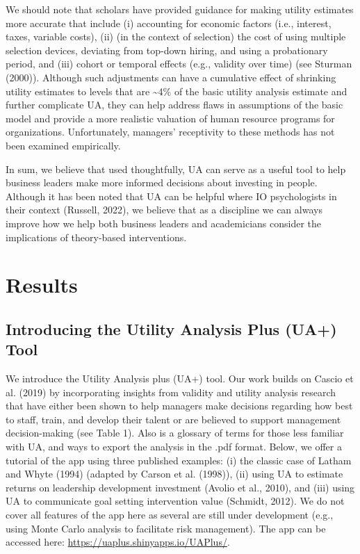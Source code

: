 \documentclass[
  english,
  man]{apa6}
\begin{document}
We should note that scholars have provided guidance for making utility estimates more accurate that include (i) accounting for economic factors (i.e., interest, taxes, variable costs), (ii) (in the context of selection) the cost of using multiple selection devices, deviating from top-down hiring, and using a probationary period, and (iii) cohort or temporal effects (e.g., validity over time) (see Sturman (2000)). Although such adjustments can have a cumulative effect of shrinking utility estimates to levels that are \textasciitilde4\% of the basic utility analysis estimate and further complicate UA, they can help address flaws in assumptions of the basic model and provide a more realistic valuation of human resource programs for organizations. Unfortunately, managers' receptivity to these methods has not been examined empirically.

In sum, we believe that used thoughtfully, UA can serve as a useful tool to help business leaders make more informed decisions about investing in people. Although it has been noted that UA can be helpful where IO psychologists in their context (Russell, 2022), we believe that as a discipline we can always improve how we help both business leaders and academicians consider the implications of theory-based interventions.

\section{Results}\label{results}

\subsection{Introducing the Utility Analysis Plus (UA+) Tool}\label{introducing-the-utility-analysis-plus-ua-tool}

We introduce the Utility Analysis plus (UA+) tool. Our work builds on Cascio et al. (2019) by incorporating insights from validity and utility analysis research that have either been shown to help managers make decisions regarding how best to staff, train, and develop their talent or are believed to support management decision-making (see Table 1). Also is a glossary of terms for those less familiar with UA, and ways to export the analysis in the .pdf format. Below, we offer a tutorial of the app using three published examples: (i) the classic case of Latham and Whyte (1994) (adapted by Carson et al. (1998)), (ii) using UA to estimate returns on leadership development investment (Avolio et al., 2010), and (iii) using UA to communicate goal setting intervention value (Schmidt, 2012). We do not cover all features of the app here as several are still under development (e.g., using Monte Carlo analysis to facilitate risk management). The app can be accessed here: \url{https://uaplus.shinyapps.io/UAPlus/}.
\end{document}
